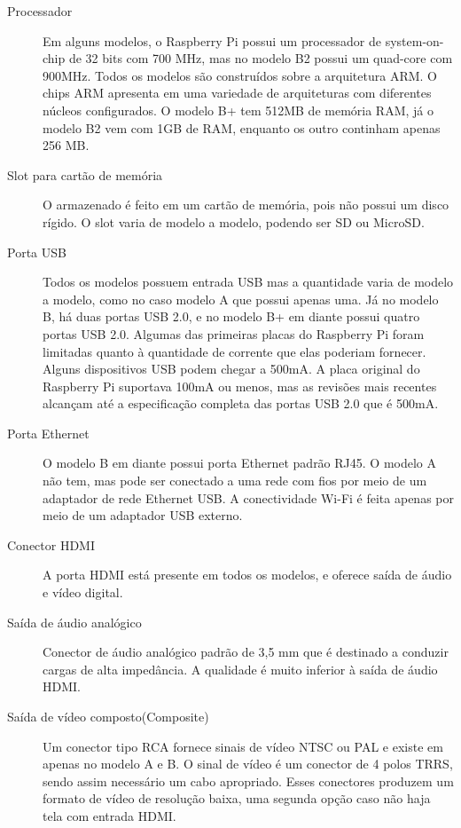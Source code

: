 \documentclass[
	12pt,				%
	openright,			%
	twoside,			%
	a4paper,			%
	chapter=TITLE,		%
	english,			%
	brazil				%
	]{abntex2}
\begin{document}
\begin{description}

\item[Processador]
Em alguns modelos, o Raspberry Pi possui um processador de system-on-chip de 32 bits com 700 MHz, mas no modelo B2 possui um quad-core com 900MHz. Todos os modelos são construídos sobre a arquitetura ARM. O chips ARM apresenta em uma variedade de arquiteturas com diferentes núcleos configurados. O modelo B+ tem 512MB de memória RAM, já o modelo B2 vem com 1GB de RAM, enquanto os outro continham apenas 256 MB.
 
\item[Slot para cartão de memória]
O armazenado é feito em um cartão de memória, pois não possui um disco rígido. O slot  varia de modelo a modelo, podendo ser SD ou MicroSD.

\item[Porta USB]
Todos os modelos possuem entrada USB mas a quantidade varia de modelo a modelo, como no caso modelo A que possui apenas uma. Já no modelo B, há duas portas USB 2.0, e no modelo B+ em diante possui quatro portas USB 2.0. Algumas das primeiras placas do Raspberry Pi foram limitadas quanto à quantidade de corrente que elas poderiam fornecer. Alguns dispositivos USB podem chegar a 500mA. A placa original do Raspberry Pi suportava 100mA ou menos, mas as revisões mais recentes alcançam até a especificação completa das portas USB 2.0 que é 500mA.

\item[Porta Ethernet] 
O modelo B em diante possui porta Ethernet padrão RJ45. O modelo A não tem, mas pode ser conectado a uma rede com fios por meio de um adaptador de rede Ethernet USB. A conectividade Wi-Fi é feita apenas por meio de um adaptador USB externo.

\item[Conector HDMI] 
A porta HDMI está presente em todos os modelos, e oferece saída de áudio e vídeo digital.

\item[Saída de áudio analógico]
Conector de áudio analógico padrão de 3,5 mm que é destinado a conduzir cargas de alta impedância. A qualidade é muito inferior à saída de áudio HDMI.

\item[Saída de vídeo composto(Composite)]
Um conector tipo RCA fornece sinais de vídeo NTSC ou PAL e existe em apenas no modelo A e B. O sinal de vídeo é um conector de 4 polos TRRS, sendo assim necessário um cabo apropriado. Esses conectores produzem um formato de vídeo de resolução baixa, uma segunda opção caso não haja tela com entrada HDMI.


\end{description}
\end{document}
